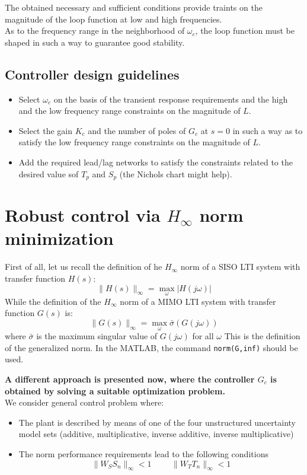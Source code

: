 The obtained necessary and sufficient conditions provide traints on the magnitude of  the loop function at low and high frequencies.\\

As to the frequency range in the neighborhood of $\omega_c$, the loop function must be shaped in such a way to guarantee good stability.\\

\subsection{Controller design guidelines}
\begin{itemize}
    \item Select $\omega_c$ on the basis of the transient response requirements and the high and the low frequency range constraints on the magnitude of $L$.
    \item Select the gain $K_c$ and the number of poles of $G_c$ at $s=0$ in such a way as to satisfy the low frequency range constraints on the magnitude of $L$.
    \item Add the required lead/lag networks to satisfy the constraints related to the desired value sof $T_p$ and $S_p$ (the Nichols chart might help).
\end{itemize}

\section{Robust control via $H_\infty$ norm minimization}


First of all, let us recall the definition of he $H_\infty$ norm of a SISO LTI system with transfer function $H(s)$:
\[
\|H(s)\|_\infty = \max\limits_{\omega} |H(j\omega)|
\]
While the definition of the $H_\infty$ norm of a MIMO LTI system with transfer function $G(s)$ is:
\[
\|G(s)\|_\infty = \max\limits_{\omega} \bar{\sigma}(G(j\omega))
\]
where $\bar{\sigma}$ is the maximum singular value of $G(j\omega)$ for all $\omega$
This is the definition of the generalized norm. In the MATLAB, the command \texttt{norm(G,inf)} should be used.

\textbf{A different approach is presented now, where the controller $G_c$ is obtained by solving a suitable optimization problem.}\\

We consider general control problem where:
\begin{itemize}
    \item The plant is described by means of one of the four unstructured uncertainty model sets (additive, multiplicative, inverse additive, inverse multiplicative)
    \item  The norm performance requirements lead to the following conditions
    \[
    \|W_SS_n\|_\infty < 1 \hspace{1cm} \|W_TT_n\|_\infty<1
    \]
\end{itemize}

